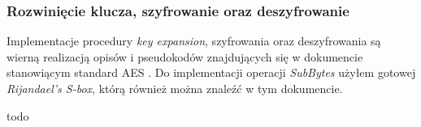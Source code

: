 \subsubsection{Rozwinięcie klucza, szyfrowanie oraz deszyfrowanie}
Implementacje procedury \textit{key expansion}, szyfrowania oraz deszyfrowania są wierną realizacją opisów i pseudokodów znajdujących się w dokumencie stanowiącym standard AES \cite{aes-standard}. Do implementacji operacji \textit{SubBytes} użyłem gotowej \textit{Rijandael's S-box}, którą również można znaleźć w tym dokumencie.

todo
